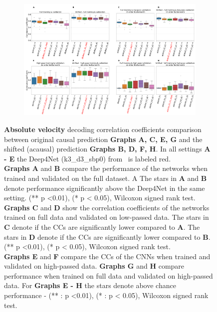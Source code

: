 \begin{figure}[!htbp]\ContinuedFloat
\begin{subfigure}[t]{\textwidth}
   \includegraphics[width=1\linewidth]{img/ch4/original_vs_shifted_absVel_performance_comparison.pdf}
   \caption{}
   \label{fig:shifted-performance-absVel}
\end{subfigure}
\caption[Absolute velocity: non-shifted vs. shifted setting performances]{{\textbf{Absolute velocity} decoding correlation coefficients comparison between original causal prediction \textbf{Graphs A, C, E, G} and the shifted (acausal) prediction \textbf{Graphs B, D, F, H}. In all settings \textbf{
   A - E} the Deep4Net (k3\_d3\_sbp0) from~\cite{Hammer-2021} is labeled red.\\ \textbf{Graphs A} and \textbf{B} compare the performance of the networks when trained and validated on the full dataset. A The stars in \textbf{A} and \textbf{B} denote performance significantly above the Deep4Net in the same setting. (** p <0.01), (* p < 0.05), Wilcoxon signed rank test.
   \\\textbf{Graphs C} and \textbf{D} show the correlation coefficients of the networks trained on full data and validated on low-passed data. 
   The stars in \textbf{C} denote if the CCs are significantly lower compared to \textbf{A}. The stars in \textbf{D} denote if the CCs are significantly lower compared to \textbf{B}. (** p <0.01), (* p < 0.05), Wilcoxon signed rank test.
   \\\textbf{Graphs E} and \textbf{F} compare the CCs of the CNNs when trained and validated on high-passed data. \textbf{Graphs G} and \textbf{H} compare performance when trained on full data and validated on high-passed data. For \textbf{Graphs E - H} the stars denote above chance performance - (** : p <0.01), (* : p < 0.05), Wilcoxon signed rank test.}}
   \label{fig:shifted-performance}
\end{figure}

